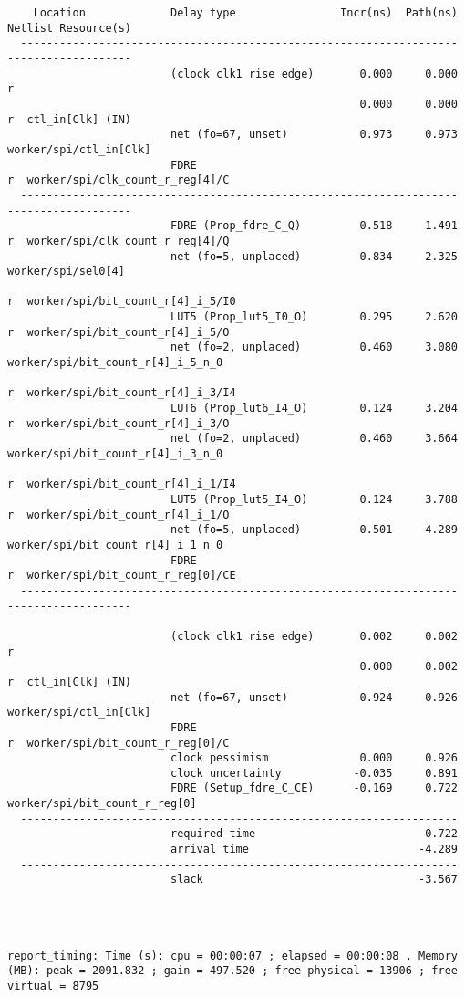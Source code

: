 \documentclass{article}
\begin{document}
\begin{lstlisting}
    Location             Delay type                Incr(ns)  Path(ns)    Netlist Resource(s)
  -------------------------------------------------------------------    -------------------
                         (clock clk1 rise edge)       0.000     0.000 r  
                                                      0.000     0.000 r  ctl_in[Clk] (IN)
                         net (fo=67, unset)           0.973     0.973    worker/spi/ctl_in[Clk]
                         FDRE                                         r  worker/spi/clk_count_r_reg[4]/C
  -------------------------------------------------------------------    -------------------
                         FDRE (Prop_fdre_C_Q)         0.518     1.491 r  worker/spi/clk_count_r_reg[4]/Q
                         net (fo=5, unplaced)         0.834     2.325    worker/spi/sel0[4]
                                                                      r  worker/spi/bit_count_r[4]_i_5/I0
                         LUT5 (Prop_lut5_I0_O)        0.295     2.620 r  worker/spi/bit_count_r[4]_i_5/O
                         net (fo=2, unplaced)         0.460     3.080    worker/spi/bit_count_r[4]_i_5_n_0
                                                                      r  worker/spi/bit_count_r[4]_i_3/I4
                         LUT6 (Prop_lut6_I4_O)        0.124     3.204 r  worker/spi/bit_count_r[4]_i_3/O
                         net (fo=2, unplaced)         0.460     3.664    worker/spi/bit_count_r[4]_i_3_n_0
                                                                      r  worker/spi/bit_count_r[4]_i_1/I4
                         LUT5 (Prop_lut5_I4_O)        0.124     3.788 r  worker/spi/bit_count_r[4]_i_1/O
                         net (fo=5, unplaced)         0.501     4.289    worker/spi/bit_count_r[4]_i_1_n_0
                         FDRE                                         r  worker/spi/bit_count_r_reg[0]/CE
  -------------------------------------------------------------------    -------------------

                         (clock clk1 rise edge)       0.002     0.002 r  
                                                      0.000     0.002 r  ctl_in[Clk] (IN)
                         net (fo=67, unset)           0.924     0.926    worker/spi/ctl_in[Clk]
                         FDRE                                         r  worker/spi/bit_count_r_reg[0]/C
                         clock pessimism              0.000     0.926    
                         clock uncertainty           -0.035     0.891    
                         FDRE (Setup_fdre_C_CE)      -0.169     0.722    worker/spi/bit_count_r_reg[0]
  -------------------------------------------------------------------
                         required time                          0.722    
                         arrival time                          -4.289    
  -------------------------------------------------------------------
                         slack                                 -3.567    




report_timing: Time (s): cpu = 00:00:07 ; elapsed = 00:00:08 . Memory (MB): peak = 2091.832 ; gain = 497.520 ; free physical = 13906 ; free virtual = 8795
\end{lstlisting}
\end{document}
